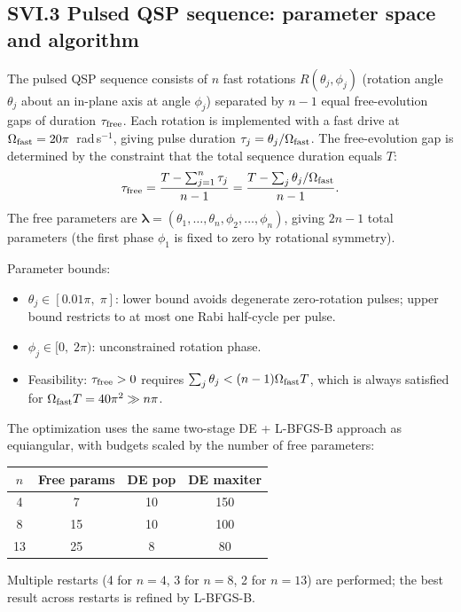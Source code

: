 \documentclass[aps,pra,twocolumn,superscriptaddress,longbibliography]{revtex4-2}
\newcommand{\be}{\begin{equation}}
\newcommand{\ee}{\end{equation}}
\begin{document}
\subsection*{SVI.3 Pulsed QSP sequence: parameter space and algorithm}

The pulsed QSP sequence consists of $n$ fast rotations $R(\theta_j, \phi_j)$
(rotation angle $\theta_j$ about an in-plane axis at angle $\phi_j$) separated
by $n-1$ equal free-evolution gaps of duration $\tau_{\rm free}$.
Each rotation is implemented with a fast drive at $\Omega_{\rm fast} = 20\pi$~rad\,s$^{-1}$,
giving pulse duration $\tau_j = \theta_j/\Omega_{\rm fast}$.
The free-evolution gap is determined by the constraint that the total sequence
duration equals $T$:
\be
  \tau_{\rm free} = \frac{T - \sum_{j=1}^n \tau_j}{n-1}
    = \frac{T - \sum_j\theta_j/\Omega_{\rm fast}}{n-1}.
\ee
The free parameters are $\boldsymbol{\lambda} = (\theta_1,\ldots,\theta_n,\phi_2,\ldots,\phi_n)$,
giving $2n-1$ total parameters (the first phase $\phi_1$ is fixed to zero by rotational
symmetry).

Parameter bounds:
\begin{itemize}
  \item $\theta_j \in [0.01\pi,\; \pi]$: lower bound avoids degenerate zero-rotation
        pulses; upper bound restricts to at most one Rabi half-cycle per pulse.
  \item $\phi_j \in [0,\; 2\pi)$: unconstrained rotation phase.
  \item Feasibility: $\tau_{\rm free} > 0$ requires
        $\sum_j\theta_j < (n-1)\Omega_{\rm fast}T$, which is always satisfied
        for $\Omega_{\rm fast} T = 40\pi^2 \gg n\pi$.
\end{itemize}

The optimization uses the same two-stage DE + L-BFGS-B approach as equiangular,
with budgets scaled by the number of free parameters:

\begin{center}
\begin{tabular}{cccc}
\toprule
$n$ & Free params & DE pop & DE maxiter \\
\midrule
4  & 7  & 10 & 150 \\
8  & 15 & 10 & 100 \\
13 & 25 & 8  & 80  \\
\bottomrule
\end{tabular}
\end{center}

Multiple restarts (4 for $n=4$, 3 for $n=8$, 2 for $n=13$) are performed; the best
result across restarts is refined by L-BFGS-B.
\end{document}
